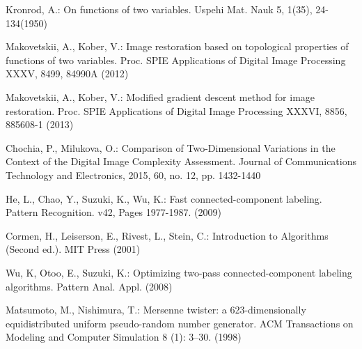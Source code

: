\documentclass[hidelinks]{llncs}
\begin{document}
\begin{thebibliography}{5}


Kronrod, A.:
On functions of two variables.
Uspehi Mat. Nauk 5, 1(35), 24-134(1950)

Makovetskii, A., Kober, V.:
Image restoration based on topological properties of functions of two variables.
Proc. SPIE Applications of Digital Image Processing XXXV, 8499, 84990A (2012)

Makovetskii, A., Kober, V.:
Modified gradient descent method for image restoration.
Proc. SPIE Applications of Digital Image Processing XXXVI, 8856, 885608-1 (2013)

Chochia, P., Milukova, O.:
Comparison of Two-Dimensional Variations in the Context of the Digital Image
Complexity Assessment.
Journal of Communications Technology and Electronics, 2015, 60, no. 12,  pp.
1432-1440

He, L., Chao, Y., Suzuki, K., Wu, K.:
Fast connected-component labeling.
Pattern Recognition. v42, Pages 1977-1987. (2009)


Cormen, H., Leiserson, E., Rivest, L., Stein, C.:
Introduction to Algorithms (Second ed.).
MIT Press (2001)

Wu, K, Otoo, E., Suzuki, K.:
Optimizing two-pass connected-component labeling algorithms.
Pattern Anal. Appl. (2008)


Matsumoto, M., Nishimura, T.:
Mersenne twister: a 623-dimensionally equidistributed uniform pseudo-random
number generator.
ACM Transactions on Modeling and Computer Simulation 8 (1): 3–30. (1998)

\end{thebibliography}
\end{document}
